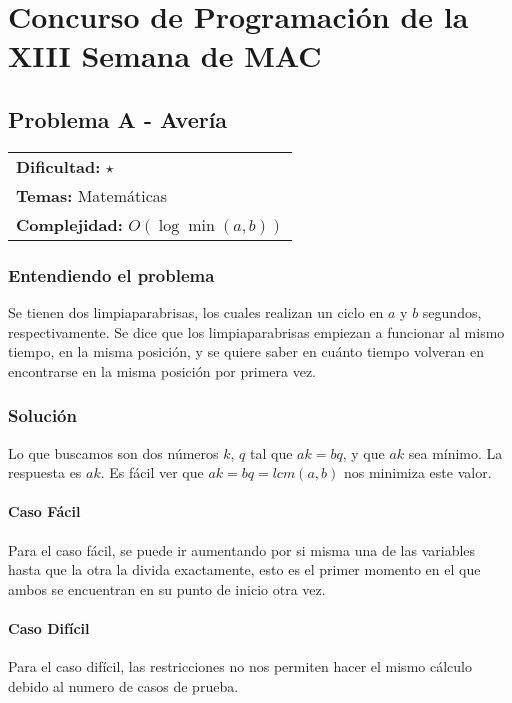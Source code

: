 \chapter{Concurso de Programación de la XIII Semana de MAC}

\section{Problema A - Avería}

\hfill
\begin{tabular}{@{}l@{}}
\textbf{Dificultad:} $\star$ \\
\textbf{Temas:} Matemáticas \\
\textbf{Complejidad:} $O(\log \min(a, b))$
\end{tabular}

\subsection*{Entendiendo el problema}
Se tienen dos limpiaparabrisas, los cuales realizan un ciclo en $a$ y $b$ segundos, respectivamente. Se dice que los limpiaparabrisas empiezan a funcionar al mismo tiempo, en la misma posición, y se quiere saber en cuánto tiempo volveran en encontrarse en la misma posición por primera vez.

\subsection*{Solución}

Lo que buscamos son dos números $k$, $q$ tal que $ak = bq$, y que $ak$ sea mínimo. La respuesta es $ak$. Es fácil ver que $ak = bq = lcm(a, b)$ nos minimiza este valor.

\subsubsection*{Caso Fácil}
Para el caso fácil, se puede ir aumentando por si misma una de las variables hasta que la otra la divida exactamente, esto es el primer momento en el que ambos se encuentran en su punto de inicio otra vez.

\subsubsection*{Caso Difícil}
Para el caso difícil, las restricciones no nos permiten hacer el mismo cálculo debido al numero de casos de prueba.

